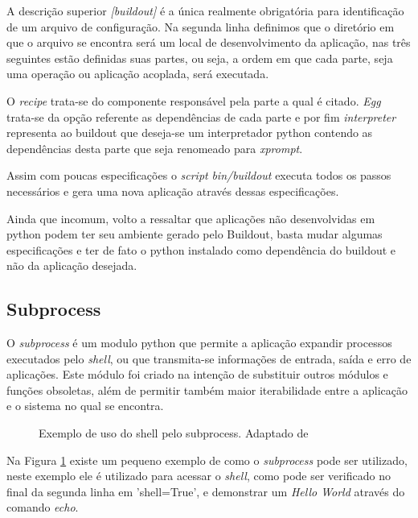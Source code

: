 A descrição superior \textit{[buildout]} é a única realmente obrigatória para identificação de um arquivo de configuração. Na segunda linha definimos que o diretório em que o arquivo se encontra será um local de desenvolvimento da aplicação, nas três seguintes estão definidas suas partes, ou seja, a ordem em que cada parte, seja uma operação ou aplicação acoplada, será executada.

O \textit{recipe} trata-se do componente responsável pela parte a qual é citado. \textit{Egg} trata-se da opção referente as dependências de cada parte e por fim \textit{interpreter} representa ao buildout que deseja-se um interpretador python contendo as dependências desta parte que seja renomeado para \textit{xprompt}.

Assim com poucas especificações o \textit{script} \textit{bin/buildout} executa todos os passos necessários e gera uma nova aplicação através dessas especificações.

Ainda que incomum, volto a ressaltar que aplicações não desenvolvidas em python podem ter seu ambiente gerado pelo Buildout, basta mudar algumas especificações e ter de fato o python instalado como dependência do buildout e não da aplicação desejada.

\subsection{Subprocess}

O \textit{subprocess} é um modulo python que permite a aplicação expandir processos executados pelo \textit{shell}, ou que transmita-se informações de entrada, saída e erro de aplicações. Este módulo foi criado na intenção de substituir outros módulos e funções obsoletas, além de permitir também maior iterabilidade entre a aplicação e o sistema no qual se encontra.

\begin{figure}[ht]
    \centering
    \caption{Exemplo de uso do shell pelo subprocess. Adaptado de \cite{GADNER-SUBPROCESS}}
    \label{subprocess}
\end{figure}

Na Figura \ref{subprocess} existe um pequeno exemplo de como o \textit{subprocess} pode ser utilizado, neste exemplo ele é utilizado para acessar o \textit{shell}, como pode ser verificado no final da segunda linha em 'shell=True', e demonstrar um \textit{Hello World} através do comando \textit{echo}.

